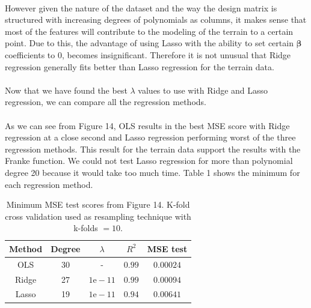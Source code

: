 \documentclass[a4paper,twocolumn]{article}
\newcommand{\B}{\boldsymbol{\beta}}
\begin{document}
\\
However given the nature of the dataset and the way the design matrix is structured with increasing degrees of polynomials as columns, it makes sense that most of the features will contribute to the modeling of the terrain to a certain point. Due to this, the advantage of using Lasso with the ability to set certain $\B$ coefficients to 0, becomes insignificant. Therefore it is not unusual that Ridge regression generally fits better than Lasso regression for the terrain data.\\
\\ 
Now that we have found the best $\lambda$ values to use with Ridge and Lasso regression, we can compare all the regression methods.\\
\\
As we can see from Figure 14, OLS results in the best MSE score with Ridge regression at a close second and Lasso regression performing worst of the three regression methods. This result for the terrain data support the results with the Franke function. We could not test Lasso regression for more than polynomial degree 20 because it would take too much time. Table 1 shows the minimum for each regression method.\\
\begin{table}[h]
    \centering
    \caption{Minimum MSE test scores from Figure 14. K-fold cross validation used as resampling technique with k-folds $= 10$.}
    \begin{tabular}{|c||c|c|c|c| }
    \hline
        Method & Degree & $\lambda$ & $R^{2}$ & MSE test \\ 
        \hline\hline
        OLS & 30 & - & $0.99$ & $0.00024$ \\ 
        \hline
        Ridge & 27 & $1\textrm{e}-11$ & $0.99$ & $0.00094$ \\
        \hline
        Lasso & 19 & $1\textrm{e}-11$ & $0.94$ & $0.00641$\\
        \hline
    \end{tabular}
\end{table}
\end{document}
